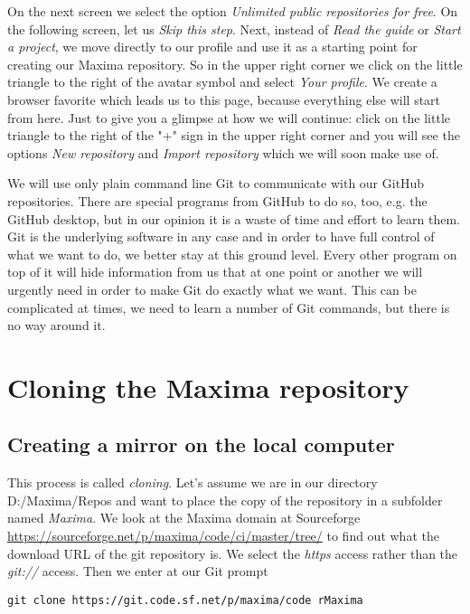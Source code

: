 \documentclass[../Maxima_Workbook.tex]{subfiles}
\begin{document}
\lz On the next screen we select the option \emph{Unlimited public repositories for free}. On the following screen, let us \emph{Skip this step}. Next, instead of \emph{Read the guide} or \emph{Start a project}, we move directly to our profile and use it as a starting point for creating our Maxima repository. So in the upper right corner we click on the little triangle to the right of the avatar symbol and select \emph{Your profile}. We create a browser favorite which leads us to this page, because everything else will start from here. Just to give you a glimpse at how we will continue: click on the little triangle to the right of the "+" sign in the upper right corner and you will see the options \emph{New repository} and \emph{Import repository} which we will soon make use of.

\lz We will use only plain command line Git to communicate with our GitHub repositories. There are special programs from GitHub to do so, too, e.g. the GitHub desktop, but in our opinion it is a waste of time and effort to learn them. Git is the underlying software in any case and in order to have full control of what we want to do, we better stay at this ground level. Every other program on top of it will hide information from us that at one point or another we will urgently need in order to make Git do exactly what we want. This can be complicated at times, we need to learn a number of Git commands, but there is no way around it.

\section{Cloning the Maxima repository}

\subsection{Creating a mirror on the local computer}

This process is called \emph{cloning}. Let's assume we are in our directory D:/Maxima/Repos and want to place the copy of the repository in a subfolder named \emph{Maxima}. We look at the Maxima domain at Sourceforge \href{https://sourceforge.net/p/maxima/code/ci/master/tree/}{https://sourceforge.net/p/maxima/code/ci/master/tree/} to find out what the download URL of the git repository is. We select the \emph{https} access rather than the \emph{git://} access. Then we enter at our Git prompt

\begin{lstlisting}[style=smallblue]
git clone https://git.code.sf.net/p/maxima/code rMaxima
\end{lstlisting}
\end{document}
